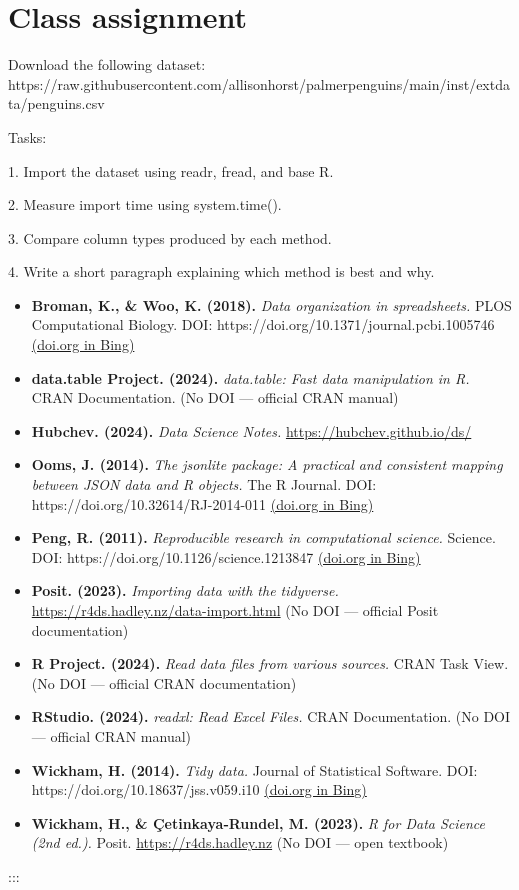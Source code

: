 \documentclass[
  doc,
  longtable,
  a4paper,
  nolmodern,
  notxfonts,
  notimes,
  colorlinks=true,linkcolor=blue,citecolor=blue,urlcolor=blue]{apa7}
\begin{document}
\section{Class assignment}\label{class-assignment}

Download the following dataset:
https://raw.githubusercontent.com/allisonhorst/palmerpenguins/main/inst/extdata/penguins.csv

Tasks:

1. Import the dataset using readr, fread, and base R.

2. Measure import time using system.time().

3. Compare column types produced by each method.

4. Write a short paragraph explaining which method is best and why.

\begin{itemize}
\item
  \textbf{Broman, K., \& Woo, K. (2018).} \emph{Data organization in
  spreadsheets.} PLOS Computational Biology. DOI:
  https://doi.org/10.1371/journal.pcbi.1005746
  \href{https://www.bing.com/search?q=\%22https\%3A\%2F\%2Fdoi.org\%2F10.1371\%2Fjournal.pcbi.1005746\%22}{(doi.org
  in Bing)}
\item
  \textbf{data.table Project. (2024).} \emph{data.table: Fast data
  manipulation in R.} CRAN Documentation. (No DOI --- official CRAN
  manual)
\item
  \textbf{Hubchev. (2024).} \emph{Data Science Notes.}
  \url{https://hubchev.github.io/ds/}
\item
  \textbf{Ooms, J. (2014).} \emph{The jsonlite package: A practical and
  consistent mapping between JSON data and R objects.} The R Journal.
  DOI: https://doi.org/10.32614/RJ-2014-011
  \href{https://www.bing.com/search?q=\%22https\%3A\%2F\%2Fdoi.org\%2F10.32614\%2FRJ-2014-011\%22}{(doi.org
  in Bing)}
\item
  \textbf{Peng, R. (2011).} \emph{Reproducible research in computational
  science.} Science. DOI: https://doi.org/10.1126/science.1213847
  \href{https://www.bing.com/search?q=\%22https\%3A\%2F\%2Fdoi.org\%2F10.1126\%2Fscience.1213847\%22}{(doi.org
  in Bing)}
\item
  \textbf{Posit. (2023).} \emph{Importing data with the tidyverse.}
  \url{https://r4ds.hadley.nz/data-import.html} (No DOI --- official
  Posit documentation)
\item
  \textbf{R Project. (2024).} \emph{Read data files from various
  sources.} CRAN Task View. (No DOI --- official CRAN documentation)
\item
  \textbf{RStudio. (2024).} \emph{readxl: Read Excel Files.} CRAN
  Documentation. (No DOI --- official CRAN manual)
\item
  \textbf{Wickham, H. (2014).} \emph{Tidy data.} Journal of Statistical
  Software. DOI: https://doi.org/10.18637/jss.v059.i10
  \href{https://www.bing.com/search?q=\%22https\%3A\%2F\%2Fdoi.org\%2F10.18637\%2Fjss.v059.i10\%22}{(doi.org
  in Bing)}
\item
  \textbf{Wickham, H., \& Çetinkaya‑Rundel, M. (2023).} \emph{R for Data
  Science (2nd ed.).} Posit. \url{https://r4ds.hadley.nz} (No DOI ---
  open textbook)
\end{itemize}

:::
\end{document}
